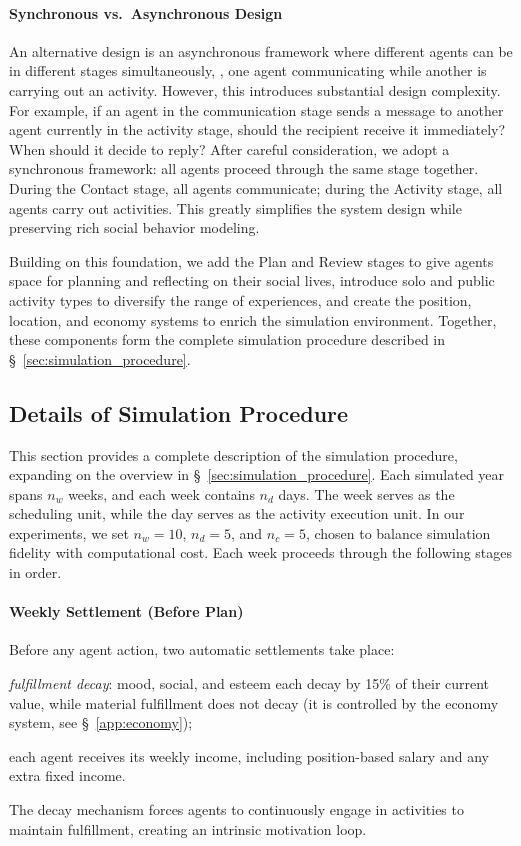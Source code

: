 \paragraph{Synchronous vs.\ Asynchronous Design}
An alternative design is an asynchronous framework where different agents can be in different stages simultaneously, \eg, one agent communicating while another is carrying out an activity.
However, this introduces substantial design complexity.
For example, if an agent in the communication stage sends a message to another agent currently in the activity stage, should the recipient receive it immediately? When should it decide to reply?
After careful consideration, we adopt a synchronous framework: all agents proceed through the same stage together.
During the Contact stage, all agents communicate; during the Activity stage, all agents carry out activities.
This greatly simplifies the system design while preserving rich social behavior modeling.

Building on this foundation, we add the Plan and Review stages to give agents space for planning and reflecting on their social lives,
introduce solo and public activity types to diversify the range of experiences,
and create the position, location, and economy systems to enrich the simulation environment.
Together, these components form the complete simulation procedure described in \S~\ref{sec:simulation_procedure}.

\subsection{Details of Simulation Procedure}
\label{sec:appendix_procedure}

This section provides a complete description of the simulation procedure, expanding on the overview in \S~\ref{sec:simulation_procedure}.
Each simulated year spans $n_w$ weeks, and each week contains $n_d$ days.
The week serves as the scheduling unit, while the day serves as the activity execution unit.
In our experiments, we set $n_w = 10$, $n_d = 5$, and $n_c = 5$, chosen to balance simulation fidelity with computational cost.
Each week proceeds through the following stages in order.

\paragraph{Weekly Settlement (Before Plan)}
Before any agent action, two automatic settlements take place:
\begin{inparaenum}[\it (1)]
\item \textit{fulfillment decay}: mood, social, and esteem each decay by 15\% of their current value, while material fulfillment does not decay (it is controlled by the economy system, see \S~\ref{app:economy});
\item each agent receives its weekly income, including position-based salary and any extra fixed income.
\end{inparaenum}
The decay mechanism forces agents to continuously engage in activities to maintain fulfillment, creating an intrinsic motivation loop.

